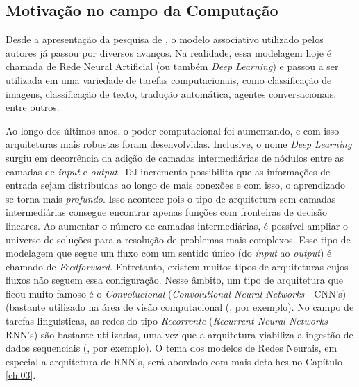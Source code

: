 


\subsection{Motivação no campo da Computação}

Desde a apresentação da pesquisa de \cite{rumelhart:1986}, o modelo associativo utilizado pelos autores já passou por diversos avanços. Na realidade, essa modelagem hoje é chamada de Rede Neural Artificial (ou também \textit{Deep Learning}) e passou a ser utilizada em uma variedade de tarefas computacionais, como classificação de imagens, classificação de texto, tradução automática, agentes conversacionais, entre outros. 

Ao longo dos últimos anos, o poder computacional foi aumentando, e com isso arquiteturas mais robustas foram desenvolvidas. Inclusive, o nome \textit{Deep Learning} surgiu em decorrência da adição de camadas intermediárias de nódulos entre as camadas de \textit{input} e \textit{output}. Tal incremento possibilita que as informações de entrada sejam distribuídas ao longo de mais conexões e com isso, o aprendizado se torna mais \textit{profundo}. Isso acontece pois o tipo de arquitetura sem camadas intermediárias consegue encontrar apenas funções com fronteiras de decisão lineares. Ao aumentar o número de camadas intermediárias, é possível ampliar o universo de soluções para a resolução de problemas mais complexos. Esse tipo de modelagem que segue um fluxo com um sentido único (do \textit{input} ao \textit{output}) é chamado de \textit{Feedforward}. Entretanto, existem muitos tipos de arquiteturas cujos fluxos não seguem essa configuração. Nesse âmbito, um tipo de arquitetura que ficou muito famoso é o \textit{Convolucional} (\textit{Convolutional Neural Networks} - CNN's) (bastante utilizado na área de visão computacional (\cite{Krizhevsky:2012}, por exemplo). No campo de tarefas linguísticas, as redes do tipo \textit{Recorrente} (\textit{Recurrent Neural Networks} - RNN's) são bastante utilizadas, uma vez que a arquitetura viabiliza a ingestão de dados sequenciais  (\cite{pengfei:2016}, por exemplo). O tema dos modelos de Redes Neurais, em especial a arquitetura de RNN's, será abordado com mais detalhes no Capítulo \ref{ch:03}.

